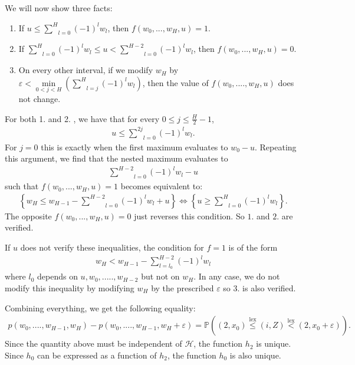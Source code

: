 \documentclass[11pt]{article}
\DeclareMathOperator{\lex}{lex}
\newcommand{\eps}{\varepsilon}
\begin{document}
We will now show three facts:
\begin{enumerate}
    \item If $u\leq  \underset{l=0}{\overset{H}{\sum}}(-1)^l w_l$, then $f(w_0,...,w_H,u)=1$.
    \item If $\underset{l=0}{\overset{H}{\sum}}(-1)^l w_l \leq  u < \underset{l=0}{\overset{H-2}{\sum}}(-1)^l w_l$, then $f(w_0,...,w_H,u)=0$.
    \item On every other interval, if we modify $w_H$ by $\eps< \underset{0<j<H}{\min}(\underset{l=j}{\overset{H}{\sum}}(-1)^l w_l)$, then the value of $f(w_0,....,w_H,u)$ does not change.
\end{enumerate}
For both 1. and 2. , we have that for every $0\leq j \leq \frac{H}{2}-1$, 
\begin{align*}
    u \leq \underset{l=0}{\overset{2j}{\sum}}(-1)^l w_l.
\end{align*}
For $j=0$ this is exactly when the first maximum evaluates to $w_0-u$. Repeating this argument, we find that the nested maximum evaluates to 
\begin{align*}
    \underset{l=0}{\overset{H-2}{\sum}}(-1)^l w_l-u
\end{align*}
such that $f(w_0,...,w_H,u)=1$ becomes equivalent to:
\begin{align*}
    \left\{ w_H \leq w_{H-1}-\underset{l=0}{\overset{H-2}{\sum}}(-1)^l w_l+u \right\}
    \Leftrightarrow  \left\{ u \geq \underset{l=0}{\overset{H}{\sum}}(-1)^l w_l \right\}.
\end{align*}
    The opposite $f(w_0,...,w_H,u)=0$ just reverses this condition. So $1.$ and $2.$ are verified. 

    
    If $u$ does not verify these inequalities, the condition for $f=1$ is of the form
\begin{align*}
    w_H<w_{H-1} - \sum_{l=l_0}^{H-2}(-1)^lw_l 
\end{align*}
    where $l_0$ depends on $u,w_0,.....,w_{H-2}$ but not on $w_H$. In any case, we do not modify this inequality by modifying $w_H$ by the prescribed $\eps$ so 3. is also verified.
    
    Combining everything, we get the following equality:
\begin{align*}
    p(w_0,....,w_{H-1},w_H)-p(w_0,....,w_{H-1},w_H+\eps) = \mathbb{P}\left( (2,x_0) \overset{\lex}{\leq} (i,Z) \overset{\lex}{<} (2,x_0+\eps) \right).
\end{align*}
Since the quantity above must be independent of ${\mathcal{H}}$, the function $h_2$ is unique. Since $h_0$ can be expressed as a function of $h_2$, the function $h_0$ is also unique.
\end{document}
